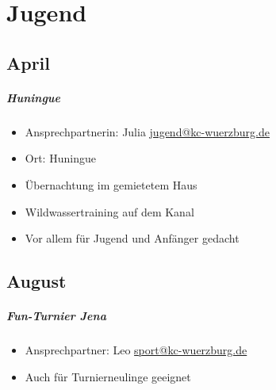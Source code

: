\documentclass[12pt, a4paper]{report}
\begin{document}
\chapter*{Jugend}
\thispagestyle{Jugend}
\pagestyle{Jugend}
\section*{April}\paragraph{Huningue}
\begin{itemize}
    \item Ansprechpartnerin: Julia \href{mailto:jugend@kc-wuerzburg.de}{jugend@kc-wuerzburg.de}
    \item Ort: Huningue
    \item Übernachtung im gemietetem Haus
    \item Wildwassertraining auf dem Kanal
    \item Vor allem für Jugend und Anfänger gedacht
\end{itemize}

\section*{August}\paragraph{Fun-Turnier Jena}
\begin{itemize}
    \item Ansprechpartner: Leo \href{mailto:sport@kc-wuerzburg.de}{sport@kc-wuerzburg.de}
    \item Auch für Turnierneulinge geeignet
\end{itemize}
\end{document}
